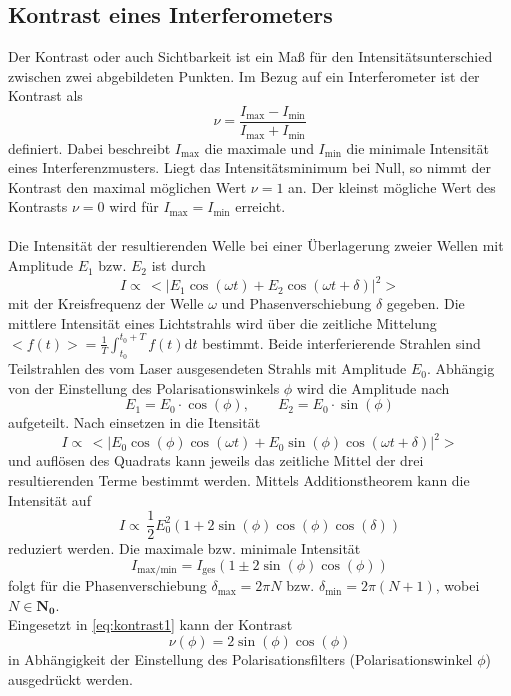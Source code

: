 \subsection{Kontrast eines Interferometers}
Der Kontrast oder auch Sichtbarkeit ist ein Maß für den Intensitätsunterschied zwischen zwei abgebildeten Punkten.
Im Bezug auf ein Interferometer ist der Kontrast als
\begin{equation}
    \nu = \frac{I_\text{max}-I_\text{min}}{I_\text{max}+I_\text{min}}
    \label{eq:kontrast1}
\end{equation}
definiert.
Dabei beschreibt $I_\text{max}$ die maximale und $I_\text{min}$ die minimale Intensität eines Interferenzmusters.
Liegt das Intensitätsminimum bei Null, so nimmt der Kontrast den maximal möglichen Wert $\nu=1$ an.
Der kleinst mögliche Wert des Kontrasts $\nu=0$ wird für $I_\text{max}=I_\text{min}$ erreicht.
\\
\\
Die Intensität der resultierenden Welle bei einer Überlagerung zweier Wellen mit Amplitude $E_1$ bzw. $E_2$ ist durch
\begin{equation*}
    I \propto \, <|E_1 \cos(\omega t) + E_2 \cos(\omega t + \delta)|^2>
\end{equation*}
mit der Kreisfrequenz der Welle $\omega$ und Phasenverschiebung $\delta$ gegeben.
Die mittlere Intensität eines Lichtstrahls wird über die zeitliche Mittelung $<f(t)> = \frac{1}{T} \int_{t_0}^{t_0 + T} f(t) \mathrm{d}t$ bestimmt.
Beide interferierende Strahlen sind Teilstrahlen des vom Laser ausgesendeten Strahls mit Amplitude $E_0$.
Abhängig von der Einstellung des Polarisationswinkels $\phi$ wird die Amplitude nach
\begin{equation*}
    E_1 = E_0 \cdot \cos(\phi), \qquad E_2 = E_0 \cdot \sin(\phi)
\end{equation*}
aufgeteilt.
Nach einsetzen in die Itensität
\begin{equation*}
    I \propto \, <|E_0 \cos(\phi) \cos(\omega t) + E_0 \sin(\phi)\cos(\omega t + \delta)|^2>
\end{equation*}
und auflösen des Quadrats kann jeweils das zeitliche Mittel der drei resultierenden Terme bestimmt werden.
Mittels Additionstheorem kann die Intensität auf
\begin{equation*}
    I \propto \, \frac{1}{2} E_0^2 ( 1 + 2 \sin(\phi) \cos(\phi) \cos(\delta) ) 
\end{equation*}
reduziert werden.
Die maximale bzw. minimale Intensität
\begin{equation*}
    I_\text{max/min} = I_\text{ges} (1 \pm 2 \sin(\phi) \cos(\phi))
\end{equation*}
folgt für die Phasenverschiebung $\delta_\text{max} = 2\pi N$ bzw. $\delta_\text{min} = 2\pi (N+1)$, wobei $N \in \mathbf{N_0}$.
\\
Eingesetzt in \autoref{eq:kontrast1} kann der Kontrast
\begin{equation}
    \nu (\phi) = 2 \sin(\phi) \cos(\phi)
    \label{eq:kontrast2}
\end{equation}
in Abhängigkeit der Einstellung des Polarisationsfilters (Polarisationswinkel $\phi$) ausgedrückt werden.

